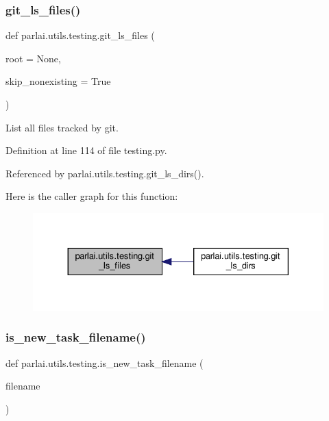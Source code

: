 \subsubsection{\texorpdfstring{git\+\_\+ls\+\_\+files()}{git\_ls\_files()}}
{\footnotesize\ttfamily def parlai.\+utils.\+testing.\+git\+\_\+ls\+\_\+files (\begin{DoxyParamCaption}\item[{}]{root = {\ttfamily None},  }\item[{}]{skip\+\_\+nonexisting = {\ttfamily True} }\end{DoxyParamCaption})}

\begin{DoxyVerb}List all files tracked by git.\end{DoxyVerb}
 

Definition at line 114 of file testing.\+py.



Referenced by parlai.\+utils.\+testing.\+git\+\_\+ls\+\_\+dirs().

Here is the caller graph for this function\+:
\nopagebreak
\begin{figure}[H]
\begin{center}
\leavevmode
\includegraphics[width=330pt]{namespaceparlai_1_1utils_1_1testing_a50b91b6f209eeedd93ae7ec0e790b121_icgraph}
\end{center}
\end{figure}
\mbox{\label{namespaceparlai_1_1utils_1_1testing_a18092382f94848a52ef19248aa39f7ca}} 
\subsubsection{\texorpdfstring{is\+\_\+new\+\_\+task\+\_\+filename()}{is\_new\_task\_filename()}}
{\footnotesize\ttfamily def parlai.\+utils.\+testing.\+is\+\_\+new\+\_\+task\+\_\+filename (\begin{DoxyParamCaption}\item[{}]{filename }\end{DoxyParamCaption})}

